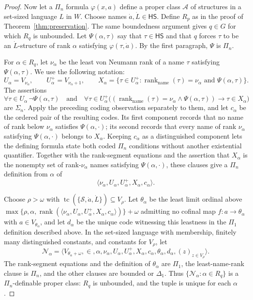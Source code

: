 \documentclass[11pt,a4paper]{amsart}
\newcommand{\HS}{\mathsf{HS}}
\newcommand{\tc}{\operatorname{tc}}
\newcommand{\rank}{\operatorname{rank}}
\newcommand{\namerank}{\operatorname{rank}_{\mathrm{name}}}
\theoremstyle{plain}
\theoremstyle{definition}
\theoremstyle{remark}
\begin{document}
\begin{proof}
Now let a $\Pi_n$ formula $\varphi(x,a)$ define a proper class $\mathcal A$ of structures in a set-sized language $L$ in $W$.  Choose names $\dot a,\dot L\in\HS$.  Define $R_p$ as in the proof of Theorem~\ref{thm:preservation}.  The same boundedness argument gives $q\in G$ for which $R_q$ is unbounded.  Let $\Psi(\alpha,\tau)$ say that $\tau\in\HS$ and that $q$ forces $\tau$ to be an $\dot L$-structure of rank $\alpha$ satisfying $\varphi(\tau,\dot a)$.  By the first paragraph, $\Psi$ is $\Pi_n$.

For $\alpha\in R_q$, let $\nu_\alpha$ be the least von Neumann rank of a name $\tau$ satisfying $\Psi(\alpha,\tau)$.  We use the following notation:
\[
U_\alpha=V_{\nu_\alpha},\qquad U_\alpha^+=V_{\nu_\alpha+1},\qquad
X_\alpha=\{\tau\in U_\alpha^+:\namerank(\tau)=\nu_\alpha\text{ and }\Psi(\alpha,\tau)\}.
\]
The assertions
\[
\forall\tau\in U_\alpha\,\neg\Psi(\alpha,\tau)
\quad\text{and}\quad
\forall\tau\in U_\alpha^+\bigl((\namerank(\tau)=\nu_\alpha\wedge\Psi(\alpha,\tau))\longrightarrow\tau\in X_\alpha\bigr)
\]
are $\Sigma_n$.  Apply the preceding coding observation separately to them, and let $c_\alpha$ be the ordered pair of the resulting codes.  Its first component records that no name of rank below $\nu_\alpha$ satisfies $\Psi(\alpha,\cdot)$; its second records that every name of rank $\nu_\alpha$ satisfying $\Psi(\alpha,\cdot)$ belongs to $X_\alpha$.  Keeping $c_\alpha$ as a distinguished component lets the defining formula state both coded $\Pi_n$ conditions without another existential quantifier.  Together with the rank-segment equations and the assertion that $X_\alpha$ is the nonempty set of rank-$\nu_\alpha$ names satisfying $\Psi(\alpha,\cdot)$, these clauses give a $\Pi_n$ definition from $\alpha$ of
\[
\langle\nu_\alpha,U_\alpha,U_\alpha^+,X_\alpha,c_\alpha\rangle.
\]

Choose $\rho>\omega$ with $\tc(\{\mathscr S,\dot a,\dot L\})\subseteq V_\rho$.  Let $\theta_\alpha$ be the least limit ordinal above $\max\{\rho,\allowbreak\alpha,\allowbreak\rank(\langle\nu_\alpha,\allowbreak U_\alpha,\allowbreak U_\alpha^+,\allowbreak X_\alpha,\allowbreak c_\alpha\rangle)\}+\omega$ admitting no cofinal map $f:a\to\theta_\alpha$ with $a\in V_{\theta_\alpha}$, and let $d_\alpha$ be the unique code witnessing this leastness in the $\Pi_1$ definition described above.  In the set-sized language with membership, finitely many distinguished constants, and constants for $V_\rho$, let
\[
\mathcal N_\alpha=\bigl\langle V_{\theta_\alpha+\omega},\in,
\alpha,\nu_\alpha,U_\alpha,U_\alpha^+,X_\alpha,c_\alpha,
\theta_\alpha,d_\alpha,(z)_{z\in V_\rho}\bigr\rangle.
\]
The rank-segment equations and the definition of $\theta_\alpha$ are $\Pi_1$, the least-name-rank clause is $\Pi_n$, and the other clauses are bounded or $\Delta_1$.  Thus $\{\mathcal N_\alpha:\alpha\in R_q\}$ is a $\Pi_n$-definable proper class: $R_q$ is unbounded, and the tuple is unique for each $\alpha$.


\end{proof}
\end{document}
